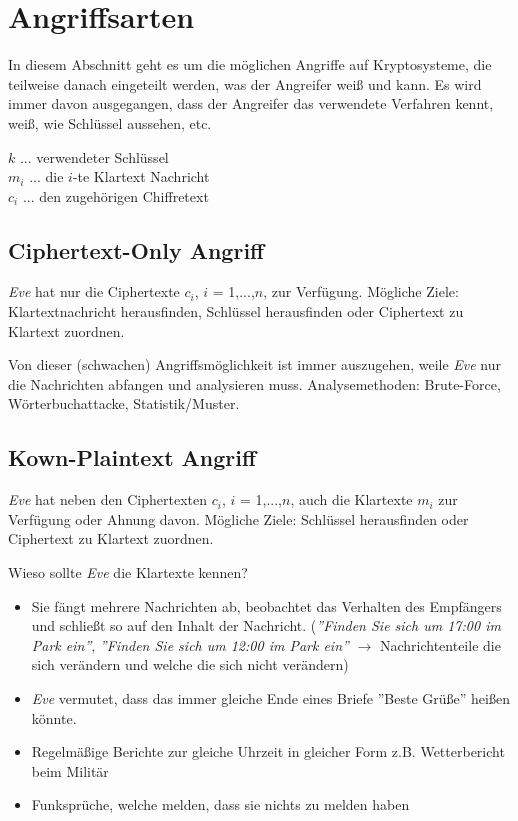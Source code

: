 \section{Angriffsarten}
In diesem Abschnitt geht es um die möglichen Angriffe auf Kryptosysteme, die teilweise danach eingeteilt werden, was der Angreifer weiß und kann. Es wird immer davon ausgegangen, dass der Angreifer das verwendete Verfahren kennt, weiß, wie Schlüssel aussehen, etc.

$k$ ... verwendeter Schlüssel \\
$m_i$ ... die $i$-te Klartext Nachricht \\
$c_i$ ... den zugehörigen Chiffretext

\subsection{Ciphertext-Only Angriff}
\textit{Eve} hat nur die Ciphertexte $c_i$, $i$ = 1,...,$n$, zur Verfügung. Mögliche Ziele: Klartextnachricht herausfinden, Schlüssel herausfinden oder Ciphertext zu Klartext zuordnen.

Von dieser (schwachen) Angriffsmöglichkeit ist immer auszugehen, weile \textit{Eve} nur die Nachrichten abfangen und analysieren muss. Analysemethoden: Brute-Force, Wörterbuchattacke, Statistik/Muster.

\subsection{Kown-Plaintext Angriff}
\textit{Eve} hat neben den Ciphertexten $c_i$, $i$ = 1,...,$n$, auch die Klartexte $m_i$ zur Verfügung oder Ahnung davon. Mögliche Ziele: Schlüssel herausfinden oder Ciphertext zu Klartext zuordnen.

Wieso sollte \textit{Eve} die Klartexte kennen?
\begin{itemize}
	\item Sie fängt mehrere Nachrichten ab, beobachtet das Verhalten des Empfängers und schließt so auf den Inhalt der Nachricht. (\textit{''Finden Sie sich um 17:00 im Park ein''}, \textit{''Finden Sie sich um 12:00 im Park ein''} $\rightarrow$ Nachrichtenteile die sich verändern und welche die sich nicht verändern)
	\item \textit{Eve} vermutet, dass das immer gleiche Ende eines Briefe ''Beste Grüße'' heißen könnte.
	\item Regelmäßige Berichte zur gleiche Uhrzeit in gleicher Form z.B. Wetterbericht beim Militär
	\item Funksprüche, welche melden, dass sie nichts zu melden haben
\end{itemize}

